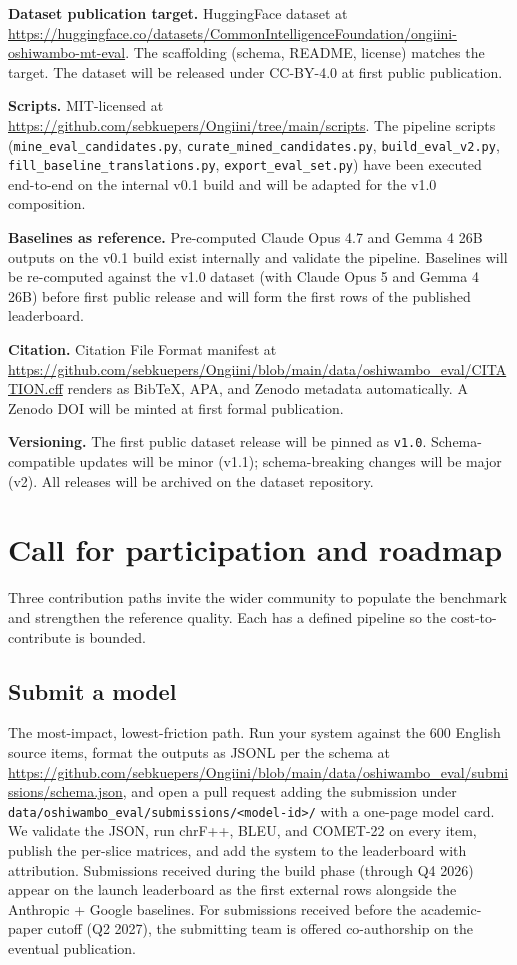 \documentclass[11pt]{article}
\begin{document}
\textbf{Dataset publication target.} HuggingFace dataset at
\url{https://huggingface.co/datasets/CommonIntelligenceFoundation/ongiini-oshiwambo-mt-eval}.
The scaffolding (schema, README, license) matches the target. The
dataset will be released under CC-BY-4.0 at first public
publication.

\textbf{Scripts.} MIT-licensed at
\url{https://github.com/sebkuepers/Ongiini/tree/main/scripts}. The
pipeline scripts (\texttt{mine\_eval\_candidates.py},
\texttt{curate\_mined\_candidates.py}, \texttt{build\_eval\_v2.py},
\texttt{fill\_baseline\_translations.py},
\texttt{export\_eval\_set.py}) have been executed end-to-end on the
internal v0.1 build and will be adapted for the v1.0 composition.

\textbf{Baselines as reference.} Pre-computed Claude Opus 4.7 and
Gemma 4 26B outputs on the v0.1 build exist internally and validate
the pipeline. Baselines will be re-computed against the v1.0
dataset (with Claude Opus 5 and Gemma 4 26B) before first public
release and will form the first rows of the published leaderboard.

\textbf{Citation.} Citation File Format manifest at
\url{https://github.com/sebkuepers/Ongiini/blob/main/data/oshiwambo_eval/CITATION.cff}
renders as BibTeX, APA, and Zenodo metadata automatically. A Zenodo
DOI will be minted at first formal publication.

\textbf{Versioning.} The first public dataset release will be
pinned as \texttt{v1.0}. Schema-compatible updates will be minor
(v1.1); schema-breaking changes will be major (v2). All releases
will be archived on the dataset repository.

\section{Call for participation and roadmap}
\label{sec:participation}

Three contribution paths invite the wider community to populate the
benchmark and strengthen the reference quality. Each has a defined
pipeline so the cost-to-contribute is bounded.

\subsection{Submit a model}

The most-impact, lowest-friction path. Run your system against the
600 English source items, format the outputs as JSONL per the
schema at
\url{https://github.com/sebkuepers/Ongiini/blob/main/data/oshiwambo_eval/submissions/schema.json},
and open a pull request adding the submission under
\texttt{data/oshiwambo\_eval/submissions/<model-id>/} with a
one-page model card. We validate the JSON, run chrF++, BLEU, and
COMET-22 on every item, publish the per-slice matrices, and add
the system to the leaderboard with attribution. Submissions
received during the build phase (through Q4 2026) appear on
the launch leaderboard as the first external rows alongside the
Anthropic + Google baselines. For submissions received before the
academic-paper cutoff (Q2 2027), the submitting team is offered
co-authorship on the eventual publication.
\end{document}
